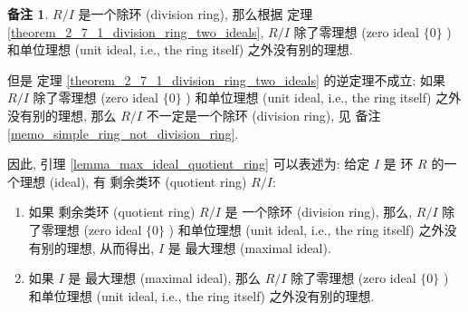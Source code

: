 \documentclass[utf8]{ctexbook}
\theoremstyle{definition}
\newtheorem{memo}{备注}[section]
\begin{document}
\begin{memo}
$R/I$ 是一个除环 (division ring), 那么根据 定理 \ref{theorem_2_7_1_division_ring_two_ideals}, $R/I$ 除了零理想 (zero ideal $\{ 0 \}$ ) 和单位理想 (unit ideal, i.e., the ring itself) 之外没有别的理想.

但是 定理 \ref{theorem_2_7_1_division_ring_two_ideals} 的逆定理不成立: 如果 $R/I$ 除了零理想 (zero ideal $\{ 0 \}$ ) 和单位理想 (unit ideal, i.e., the ring itself) 之外没有别的理想, 那么 $R/I$ 不一定是一个除环 (division ring), 见 备注 \ref{memo_simple_ring_not_division_ring}.

因此, 引理 \ref{lemma_max_ideal_quotient_ring} 可以表述为: 给定 $I$ 是 环 $R$ 的一个理想 (ideal), 有 剩余类环 (quotient ring) $R/I$:
\begin{enumerate}
\item{如果 剩余类环 (quotient ring) $R/I$ 是 一个除环 (division ring), 那么, $R/I$ 除了零理想 (zero ideal $\{ 0 \}$ ) 和单位理想 (unit ideal, i.e., the ring itself) 之外没有别的理想, 从而得出, $I$ 是 最大理想 (maximal ideal).}
\item{如果 $I$ 是 最大理想 (maximal ideal), 那么 $R/I$ 除了零理想 (zero ideal $\{ 0 \}$ ) 和单位理想 (unit ideal, i.e., the ring itself) 之外没有别的理想.}
\end{enumerate}
\end{memo}
\end{document}
